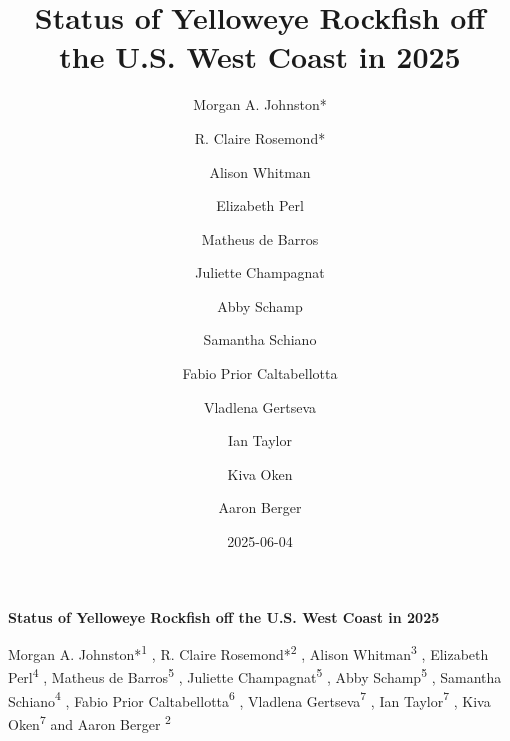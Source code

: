 \documentclass[
]{scrartcl}
\title{Status of Yelloweye Rockfish off the U.S. West Coast in 2025}
\author{Morgan A. Johnston* \and R. Claire Rosemond* \and Alison
Whitman \and Elizabeth Perl \and Matheus de Barros \and Juliette
Champagnat \and Abby Schamp \and Samantha Schiano \and Fabio Prior
Caltabellotta \and Vladlena Gertseva \and Ian Taylor \and Kiva
Oken \and Aaron Berger}
\date{2025-06-04}
\begin{document}
  \begin{titlepage}

  \begin{minipage}[b][\textheight][s]{\textwidth}


  \raggedright




  {\huge\bfseries\nohyphens{Status of Yelloweye Rockfish off the U.S.
  West Coast in 2025}}\\[1\baselineskip]



  \vspace{1\baselineskip}


  \vspace{1\baselineskip}

   {\large{Morgan A. Johnston*}}{\textsuperscript{1}}%
  ,
   {\large{R. Claire Rosemond*}}{\textsuperscript{2}}%
  ,
   {\large{Alison Whitman}}{\textsuperscript{3}}%
  ,
   {\large{Elizabeth Perl}}{\textsuperscript{4}}%
  ,
   {\large{Matheus de Barros}}{\textsuperscript{5}}%
  ,
   {\large{Juliette Champagnat}}{\textsuperscript{5}}%
  ,
   {\large{Abby Schamp}}{\textsuperscript{5}}%
  ,
   {\large{Samantha Schiano}}{\textsuperscript{4}}%
  ,
   {\large{Fabio Prior Caltabellotta}}{\textsuperscript{6}}%
  ,
   {\large{Vladlena Gertseva}}{\textsuperscript{7}}%
  ,
   {\large{Ian Taylor}}{\textsuperscript{7}}%
  ,
   {\large{Kiva Oken}}{\textsuperscript{7}}%
  { and \large{Aaron Berger}}%
  {\textsuperscript{2}}%



\end{minipage}
\end{titlepage}
\end{document}
